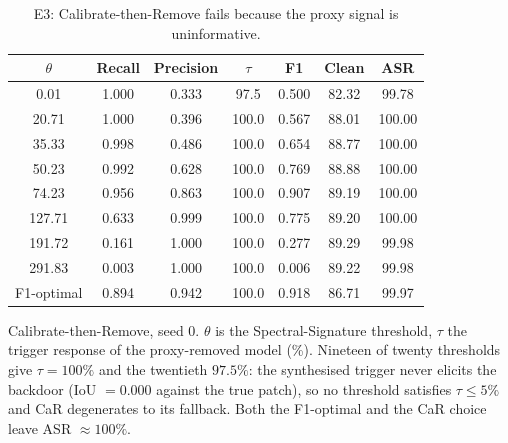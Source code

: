 \begin{table}[t]
\centering
\caption{E3: Calibrate-then-Remove fails because the proxy signal is uninformative.}
\label{tab:car}
\footnotesize
\begin{tabular}{ccccccc}
\toprule
\textbf{$\theta$} & \textbf{Recall} & \textbf{Precision} & \textbf{$\tau$} & \textbf{F1} & \textbf{Clean} & \textbf{ASR} \\
\midrule
0.01 & 1.000 & 0.333 & 97.5 & 0.500 & 82.32 & 99.78 \\
20.71 & 1.000 & 0.396 & 100.0 & 0.567 & 88.01 & 100.00 \\
35.33 & 0.998 & 0.486 & 100.0 & 0.654 & 88.77 & 100.00 \\
50.23 & 0.992 & 0.628 & 100.0 & 0.769 & 88.88 & 100.00 \\
74.23 & 0.956 & 0.863 & 100.0 & 0.907 & 89.19 & 100.00 \\
127.71 & 0.633 & 0.999 & 100.0 & 0.775 & 89.20 & 100.00 \\
191.72 & 0.161 & 1.000 & 100.0 & 0.277 & 89.29 & 99.98 \\
291.83 & 0.003 & 1.000 & 100.0 & 0.006 & 89.22 & 99.98 \\
\midrule
F1-optimal & 0.894 & 0.942 & 100.0 & 0.918 & 86.71 & 99.97 \\
\bottomrule
\end{tabular}
\par\vspace{1pt}\footnotesize\raggedright Calibrate-then-Remove, seed 0. $\theta$ is the Spectral-Signature threshold, $\tau$ the trigger response of the proxy-removed model (\%). Nineteen of twenty thresholds give $\tau{=}100\%$ and the twentieth $97.5\%$: the synthesised trigger never elicits the backdoor (IoU $=0.000$ against the true patch), so no threshold satisfies $\tau\leq5\%$ and CaR degenerates to its fallback. Both the F1-optimal and the CaR choice leave ASR $\approx100\%$.
\end{table}

